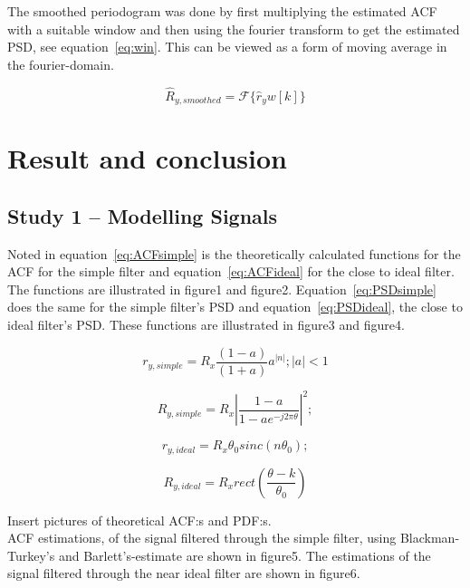 \documentclass[10pt]{article}
\begin{document}
The smoothed periodogram was done by first multiplying the estimated ACF with a
 suitable window and then using the fourier transform to get the estimated PSD,
 see equation~\ref{eq:win}. This can be viewed as a form of moving average in the fourier-domain.

 \begin{equation}
 \label{eq:win}
 \hat{R}_{y,smoothed} = \mathcal{F}\{\hat{r}_yw[k]\}
 \end{equation}


\section{Result and conclusion}
\subsection{Study 1 – Modelling Signals}

Noted in equation~\ref{eq:ACFsimple} is the theoretically calculated functions for the ACF
for the simple filter and equation~\ref{eq:ACFideal} for the close to ideal filter. The functions are illustrated in figure1 and figure2.
Equation~\ref{eq:PSDsimple} does the same for the simple filter's PSD
and equation~\ref{eq:PSDideal}, the close to ideal filter's PSD. These functions are illustrated in figure3 and figure4.

\begin{equation}
  \label{eq:ACFsimple}
  r_{y,simple} = R_x\frac{(1-a)}{(1+a)}a^{|n|};  |a| < 1
\end{equation}

\begin{equation}
  \label{eq:PSDsimple}
  R_{y,simple} =  R_x|\frac{1-a}{1-ae^{-j2\pi\theta}}|^2;
\end{equation}

\begin{equation}
  \label{eq:ACFideal}
  r_{y,ideal} = R_x\theta_{0}sinc(n\theta_0);
\end{equation}

\begin{equation}
  \label{eq:PSDideal}
  R_{y,ideal} = R_xrect(\frac{\theta - k}{\theta_0})
\end{equation}

Insert pictures of theoretical ACF:s and PDF:s.\\

ACF estimations, of the signal filtered through the simple filter, using Blackman-Turkey's and Barlett's-estimate are shown in figure5. The estimations of the signal filtered through the near ideal filter are shown in figure6.\\
\end{document}
